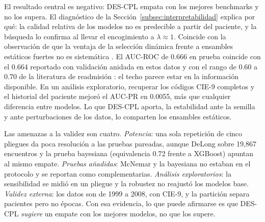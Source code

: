 \documentclass[pdflatex,sn-mathphys-num]{sn-jnl}
\theoremstyle{plain}
\begin{document}
El resultado central es negativo: DES-CPL empata con los mejores benchmarks y no los supera. El diagnóstico de la Sección~\ref{subsec:interpretabilidad} explica por qué: la calidad relativa de los modelos no es predecible a partir del paciente, y la búsqueda lo confirma al llevar el encogimiento a $\lambda\approx1$. Coincide con la observación de que la ventaja de la selección dinámica frente a ensambles estáticos fuertes no es sistemática \cite{bib_cruz_2018}. El AUC-ROC de 0.666 en prueba coincide con el 0.664 reportado con validación anidada en estos datos \cite{bib_salim_2026} y con el rango de 0.60 a 0.70 de la literatura de readmisión \cite{bib_kansagara}: el techo parece estar en la información disponible. En un análisis exploratorio, recuperar los códigos CIE-9 completos y el historial del paciente mejoró el AUC-PR en 0.0055, más que cualquier diferencia entre modelos. Lo que DES-CPL aporta, la estabilidad ante la semilla y ante perturbaciones de los datos, lo comparten los ensambles estáticos.

Las amenazas a la validez son cuatro. \emph{Potencia}: una sola repetición de cinco pliegues da poca resolución a las pruebas pareadas, aunque DeLong sobre 19{,}867 encuentros y la prueba bayesiana (equivalencia 0.72 frente a XGBoost) apuntan al mismo empate. \emph{Pruebas añadidas}: McNemar y la bayesiana no estaban en el protocolo y se reportan como complementarias. \emph{Análisis exploratorios}: la sensibilidad se midió en un pliegue y la robustez no reajustó los modelos base. \emph{Validez externa}: los datos son de 1999 a 2008, con CIE-9, y la partición separa pacientes pero no épocas. Con esa evidencia, lo que puede afirmarse es que DES-CPL \emph{sugiere} un empate con los mejores modelos, no que los supere.

\backmatter
\end{document}
